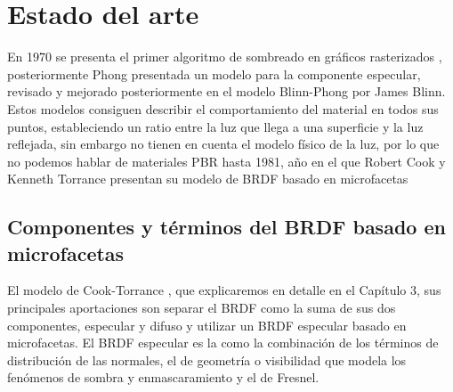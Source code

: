 \chapter{Estado del arte}

En 1970 se presenta el primer algoritmo de sombreado en gr\'aficos rasterizados \autocite{gouraud}, posteriormente 
Phong \autocite{phong} presentada un modelo para la componente especular, revisado y mejorado posteriormente en el modelo Blinn-Phong
\autocite{blinnphong} por James Blinn. Estos modelos consiguen describir el comportamiento del material en todos sus puntos,
estableciendo un ratio entre la luz que llega a una superficie y la luz reflejada, sin embargo no tienen en cuenta el modelo f\'isico de
la luz, por lo que no podemos hablar de materiales PBR hasta 1981, a\~no en el que Robert Cook y Kenneth Torrance presentan su modelo
de BRDF basado en microfacetas \autocite{cooktorrance}

\section{Componentes y t\'erminos del BRDF basado en microfacetas}

El modelo de Cook-Torrance \autocite{cooktorrance}, que explicaremos en detalle en el Cap\'itulo 3, sus principales aportaciones son
separar el BRDF como la suma de sus dos componentes, especular y difuso y utilizar un BRDF especular basado en microfacetas. El BRDF
especular es la como la combinaci\'on de los t\'erminos de distribuci\'on de las normales, el de geometr\'ia o visibilidad que modela
los fen\'omenos de sombra y enmascaramiento y el de Fresnel.

